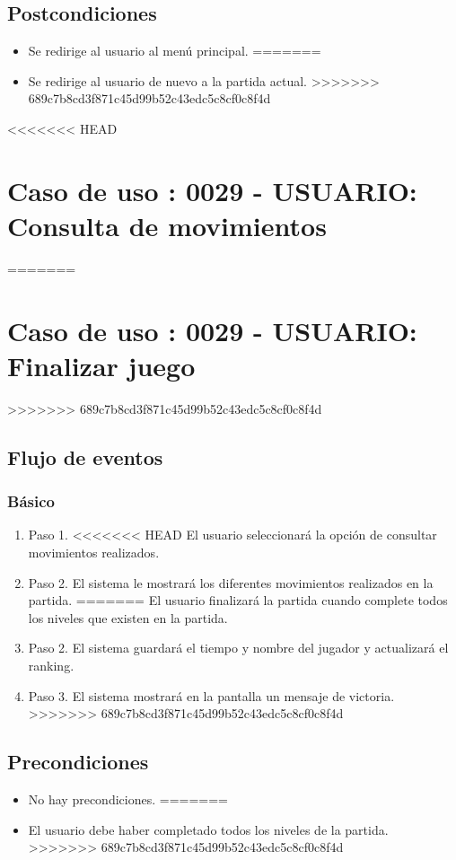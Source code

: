 \subsection{Postcondiciones}
\begin{itemize}
<<<<<<< HEAD
\item Se redirige al usuario al menú principal.
=======
\item Se redirige al usuario de nuevo a la partida actual.
>>>>>>> 689c7b8cd3f871c45d99b52c43edc5c8cf0c8f4d
\end{itemize}



<<<<<<< HEAD
\section{Caso de uso : 0029 - USUARIO: Consulta de movimientos}\label{sec:uc0}
=======
\section{Caso de uso : 0029 - USUARIO: Finalizar juego}\label{sec:uc0}
>>>>>>> 689c7b8cd3f871c45d99b52c43edc5c8cf0c8f4d
\subsection{Flujo de eventos}
\subsubsection{Básico}

\begin{enumerate}
\item Paso 1.
<<<<<<< HEAD
El usuario seleccionará la opción de consultar movimientos realizados.
\item Paso 2.
El sistema le mostrará los diferentes movimientos realizados en la partida.
=======
El usuario finalizará la partida cuando complete todos los niveles que existen en la partida. 
\item Paso 2.
El sistema guardará el tiempo y nombre del jugador y actualizará el ranking.
\item Paso 3.
El sistema mostrará en la pantalla un mensaje de victoria.
>>>>>>> 689c7b8cd3f871c45d99b52c43edc5c8cf0c8f4d
\end{enumerate}

\subsection{Precondiciones}
\begin{itemize}
<<<<<<< HEAD
\item No hay precondiciones.
=======
\item El usuario debe haber completado todos los niveles de la partida.
>>>>>>> 689c7b8cd3f871c45d99b52c43edc5c8cf0c8f4d
\end{itemize}

